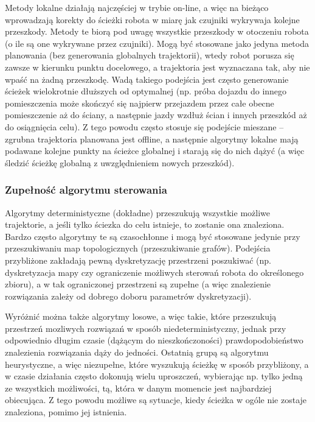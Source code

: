 Metody lokalne działają najczęściej w trybie on-line, a więc na bieżąco wprowadzają korekty
do ścieżki robota w miarę jak czujniki wykrywaja kolejne przeszkody. Metody te biorą
pod uwagę wszystkie przeszkody w otoczeniu robota (o ile są one wykrywane przez czujniki).
Mogą być stosowane jako jedyna metoda planowania (bez generowania globalnych trajektorii),
wtedy robot porusza się zawsze w kierunku punktu docelowego, a trajektoria jest wyznaczana
tak, aby nie wpaść na żadną przeszkodę. Wadą takiego podejścia jest często generowanie
ścieżek wielokrotnie dłuższych od optymalnej (np. próba dojazdu do innego pomieszczenia
może skończyć się najpierw przejazdem przez całe obecne pomieszczenie aż do ściany, a następnie
jazdy wzdłuż ścian i innych przeszkód aż do osiągnięcia celu). Z tego powodu często
stosuje się podejście mieszane -- zgrubna trajektoria planowana jest offline, a następnie
algorytmy lokalne mają podawane kolejne punkty na ścieżce globalnej i starają się do nich
dążyć (a więc śledzić ścieżkę globalną z uwzględnieniem nowych przeszkód).

\subsubsection{Zupełność algorytmu sterowania}

Algorytmy deterministyczne (dokładne) przeszukują wszystkie możliwe trajektorie,
a jeśli tylko ściezka do celu istnieje, to zostanie ona znaleziona. Bardzo często algorytmy
te są czasochłonne i mogą być stosowane jedynie przy przeszukiwaniu map topologicznych
(przeszukiwanie grafów). Podejścia przybliżone zakładają pewną dyskretyzację przestrzeni
poszukiwać (np. dyskretyzacja mapy czy ograniczenie możliwych sterowań robota do określonego
zbioru), a w tak ograniczonej przestrzeni są zupełne (a więc znalezienie rozwiązania
zależy od dobrego doboru parametrów dyskretyzacji).

Wyróżnić można także algorytmy losowe, a więc takie, które przeszukują przestrzeń
mozliwych rozwiązań w sposób niedeterministyczny, jednak przy odpowiednio długim czasie
(dążącym do nieszkończoności) prawdopodobieństwo znalezienia rozwiązania dąży do jedności.
Ostatnią grupą są algorytmu heurystyczne, a więc niezupełne, które wyszukują ścieżkę
w sposób przybliżony, a w czasie działania często dokonują wielu uproszczeń, wybierając
np. tylko jedną ze wszystkich możliwości, tą, która w danym momencie jest najbardziej
obiecująca. Z tego powodu możliwe są sytuacje, kiedy ścieżka w ogóle nie zostaje
znaleziona, pomimo jej istnienia.

